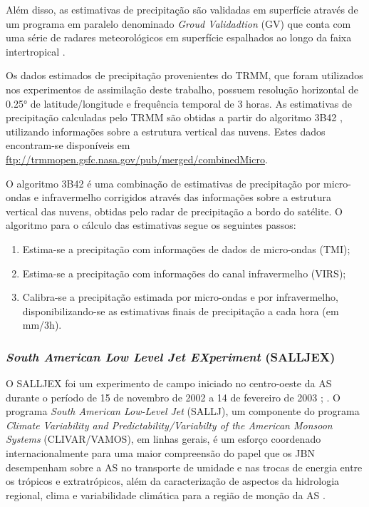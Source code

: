 Além disso, as estimativas de precipitação são validadas em superfície através de um programa em paralelo denominado \textit{Groud Validadtion} (GV) que conta com uma série de radares meteorológicos em superfície espalhados ao longo da faixa intertropical \cite{collischonnetal07}.

Os dados estimados de precipitação provenientes do TRMM, que foram utilizados nos experimentos de assimilação deste trabalho, possuem resolução horizontal de 0.25° de latitude/longitude e frequência temporal de 3 horas. As estimativas de precipitação calculadas pelo TRMM são obtidas a partir do algoritmo 3B42 \cite{huffmanetal07}, utilizando informações sobre a estrutura vertical das nuvens. Estes dados encontram-se disponíveis em \url{ftp://trmmopen.gsfc.nasa.gov/pub/merged/combinedMicro}.
    
O algoritmo 3B42 é uma combinação de estimativas de precipitação por micro-ondas e infravermelho corrigidos através das informações sobre a estrutura vertical das nuvens, obtidas pelo radar de precipitação a bordo do satélite. O algoritmo para o cálculo das estimativas segue os seguintes passos:

\begin{enumerate}
\item Estima-se a precipitação com informações de dados de micro-ondas (TMI);
\item Estima-se a precipitação com informações do canal infravermelho (VIRS);
\item Calibra-se a precipitação estimada por micro-ondas e por infravermelho, disponibilizando-se as estimativas finais de precipitação a cada hora (em mm/3h).
\end{enumerate}

\subsubsection{\textit{South American Low Level Jet EXperiment} (SALLJEX)}

O SALLJEX foi um experimento de campo iniciado no centro-oeste da AS durante o período de 15 de novembro de 2002 a 14 de fevereiro de 2003 \cite{vera06}; \cite{herdiesetal07}. O programa \textit{South American Low-Level Jet} (SALLJ), um componente do programa \textit{Climate Variability and Predictability/Variabilty of the American Monsoon Systems} (CLIVAR/VAMOS), em linhas gerais, é um esforço coordenado internacionalmente para uma maior compreensão do papel que os JBN desempenham sobre a AS no transporte de umidade e nas trocas de energia entre os trópicos e extratrópicos, além da caracterização de aspectos da hidrologia regional, clima e variabilidade climática para a região de monção da AS \cite{herdiesetal07}.

